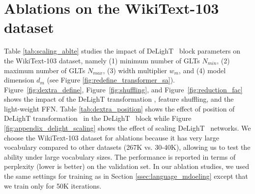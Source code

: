 \section{Ablations on the WikiText-103 dataset}
\label{sec:appendix_ablations}
Table \ref{tab:scaling_ablte} studies the impact of DeLighT ~block parameters on the WikiText-103 dataset, namely (1) minimum number of GLTs $N_{min}$, (2) maximum number of GLTs $N_{max}$, (3) width multiplier $w_m$, and (4) model dimension $d_m$ (see Figure \ref{fig:redefine_transformer_sa}). Figure~\ref{fig:dextra_define}, Figure~\ref{fig:shuffling}, and Figure~\ref{fig:reduction_fac} shows the impact of the DeLighT transformation , feature shuffling, and the light-weight FFN. Table \ref{tab:dextra_position} shows the effect of position of DeLighT transformation ~in the DeLighT ~block while Figure \ref{fig:appendix_delight_scaling} shows the effect of scaling DeLighT ~networks. We choose the WikiText-103 dataset for ablations because it has very large vocabulary compared to other datasets (267K vs. 30-40K), allowing us to test the ability under large vocabulary sizes. The performance is reported in terms of perplexity (lower is better) on the validation set. In our ablation studies, we used the same settings for training as in Section \ref{ssec:language_mdoeling} except that we train only for 50K iterations.

